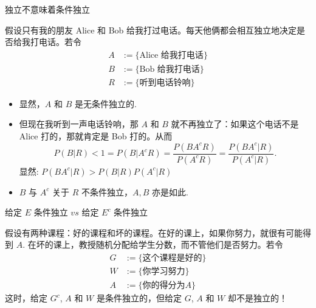 \begin{frame}{独立不意味着条件独立}
\begin{exam}
假设只有我的朋友 Alice 和 Bob 给我打过电话。每天他俩都会相互独立地决定是否给我打电话。若令
\begin{align*}
	 A&:= \{\mbox{Alice 给我打电话}\}\\
	 B&:= \{\mbox{Bob 给我打电话}\}\\
     R&:=\{\mbox{听到电话铃响}\}
  \end{align*}
  \pause
  \begin{itemize}[<+-|alert@+>]
  \item 显然，$A$ 和 $B$ 是无条件独立的.
  \item 但现在我听到一声电话铃响，那 $A$ 和 $B$ 就不再独立了：如果这个电话不是 Alice 打的，那就肯定是 Bob 打的。从而 \pause
  $$P(B|R)<1=P(B|A^cR)= \frac{P(BA^cR)}{P(A^cR)}= \frac{P(BA^c|R)}{P(A^c|R)}.$$
  显然: $P (BA^c|R)>P (B|R) P (A^c|R)$
  \item $B$ 与 $A^c$ 关于 $R$ 不条件独立，$A,B$ 亦是如此.
  \end{itemize}

\end{exam}
\end{frame}

\begin{frame}{给定 $E$ 条件独立 $vs$ 给定 $E^c$ 条件独立}
\begin{exam}
\label{27}
假设有两种课程：好的课程和坏的课程。在好的课上，如果你努力，就很有可能得到 $A$. 在坏的课上，教授随机分配给学生分数，而不管他们是否努力。若令
\begin{align*}
	G&:= \{\mbox{这个课程是好的}\}\\
	W&:= \{\mbox{你学习努力}\}\\
	A&:=\{\mbox{你的得分为} A\}
 \end{align*}
 \pause 这时，给定 $G^c$, $A$ 和 $W$ 是条件独立的，但给定 $G$, $A$ 和 $W$ 却不是独立的！

\end{exam}
\end{frame}


